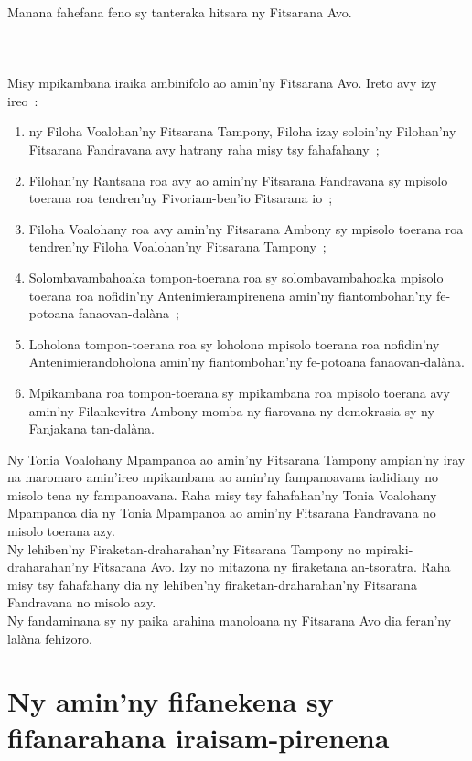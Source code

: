 \documentclass[12pt]{article}
\newcounter{laharana}
\newcommand{\andininy}[0]{
  \paragraph{%
    \NoCaseChange{%
      Andininy~\addtocounter{laharana}{1}\thelaharana.}\label{and:\thelaharana}~%
  }%
}
\begin{document}
\andininy{}Manana fahefana feno sy tanteraka hitsara ny Fitsarana Avo.

\andininy{}Misy mpikambana iraika ambinifolo ao amin'ny Fitsarana Avo. Ireto avy
izy ireo~:
\begin{enumerate}
\item ny Filoha Voalohan'ny Fitsarana Tampony, Filoha izay soloin'ny Filohan'ny
  Fitsarana Fandravana avy hatrany raha misy tsy fahafahany~;

\item Filohan'ny Rantsana roa avy ao amin'ny Fitsarana Fandravana sy mpisolo
  toerana roa tendren'ny Fivoriam-ben'io Fitsarana io~;

\item Filoha Voalohany roa avy amin'ny Fitsarana Ambony sy mpisolo toerana roa
  tendren'ny Filoha Voalohan'ny Fitsarana Tampony~;

\item Solombavambahoaka tompon-toerana roa sy solombavambahoaka mpisolo toerana
  roa nofidin'ny Antenimierampirenena amin'ny fiantombohan'ny fe-potoana
  fanaovan-dalàna~;

\item Loholona tompon-toerana roa sy loholona mpisolo toerana roa nofidin'ny
  Antenimierandoholona amin'ny fiantombohan'ny fe-potoana fanaovan-dalàna.

\item Mpikambana roa tompon-toerana sy mpikambana roa mpisolo toerana avy
  amin'ny Filankevitra Ambony momba ny fiarovana ny demokrasia sy ny Fanjakana
  tan-dalàna.
\end{enumerate}
\noindent
Ny Tonia Voalohany Mpampanoa ao amin'ny Fitsarana Tampony ampian'ny iray na
maromaro amin'ireo mpikambana ao amin'ny fampanoavana iadidiany no misolo tena
ny fampanoavana. Raha misy tsy fahafahan'ny Tonia Voalohany Mpampanoa dia ny
Tonia Mpampanoa ao amin'ny Fitsarana Fandravana no misolo toerana azy.\\

\noindent
Ny lehiben'ny Firaketan-draharahan'ny Fitsarana Tampony no mpiraki-draharahan'ny
Fitsarana Avo.  Izy no mitazona ny firaketana an-tsoratra. Raha misy tsy
fahafahany dia ny lehiben'ny firaketan-draharahan'ny Fitsarana Fandravana no
misolo azy.\\

\noindent
Ny fandaminana sy ny paika arahina manoloana ny Fitsarana Avo dia feran'ny
lalàna fehizoro.


\section{Ny amin'ny fifanekena sy fifanarahana iraisam-pirenena}
\label{sec:ny-aminny-fifanekena}
\end{document}

